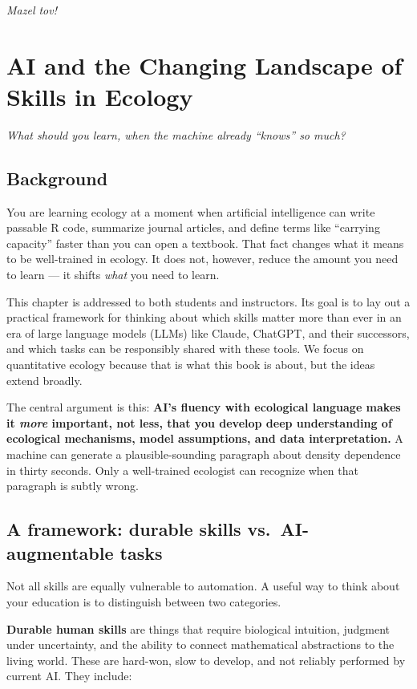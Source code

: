 \documentclass[
  letterpaper,
  DIV=11,
  numbers=noendperiod]{scrreprt}
\begin{document}
\emph{Mazel tov!}


\chapter{AI and the Changing Landscape of Skills in
Ecology}\label{sec-ai-skills}

\emph{What should you learn, when the machine already ``knows'' so
much?}

\section{Background}\label{background}

You are learning ecology at a moment when artificial intelligence can
write passable R code, summarize journal articles, and define terms like
``carrying capacity'' faster than you can open a textbook. That fact
changes what it means to be well-trained in ecology. It does not,
however, reduce the amount you need to learn --- it shifts \emph{what}
you need to learn.

This chapter is addressed to both students and instructors. Its goal is
to lay out a practical framework for thinking about which skills matter
more than ever in an era of large language models (LLMs) like Claude,
ChatGPT, and their successors, and which tasks can be responsibly shared
with these tools. We focus on quantitative ecology because that is what
this book is about, but the ideas extend broadly.

The central argument is this: \textbf{AI's fluency with ecological
language makes it \emph{more} important, not less, that you develop deep
understanding of ecological mechanisms, model assumptions, and data
interpretation.} A machine can generate a plausible-sounding paragraph
about density dependence in thirty seconds. Only a well-trained
ecologist can recognize when that paragraph is subtly wrong.

\section{A framework: durable skills vs.~AI-augmentable
tasks}\label{a-framework-durable-skills-vs.-ai-augmentable-tasks}

Not all skills are equally vulnerable to automation. A useful way to
think about your education is to distinguish between two categories.

\textbf{Durable human skills} are things that require biological
intuition, judgment under uncertainty, and the ability to connect
mathematical abstractions to the living world. These are hard-won, slow
to develop, and not reliably performed by current AI. They include:
\end{document}
